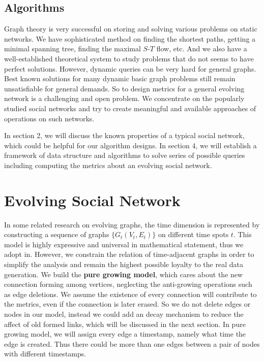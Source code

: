\documentclass[12pt,abstract=true]{scrartcl}
\numberwithin{equation}{section}
\theoremstyle{definition}   \newtheorem{definition}{Definition}[section]
\theoremstyle{plain}        \newtheorem{theorem}{Theorem}[section]
\theoremstyle{plain}        \newtheorem{observation}{Observation}[section]
\theoremstyle{plain}        \newtheorem{fact}{Fact}[section]
\theoremstyle{plain}        \newtheorem{claim}{Claim}[section]
\theoremstyle{plain}        \newtheorem{lemma}[theorem]{Lemma}
\theoremstyle{plain}        \newtheorem{corollary}[theorem]{Corollary}
\theoremstyle{remark}       \newtheorem{example}{Example}[section]
\theoremstyle{remark}       \newtheorem{remark}{Remark}[section]
\begin{document}
\subsection{Algorithms}
Graph theory is very successful on storing and solving various problems on
static networks. We have sophisticated method on finding the shortest
paths, getting a minimal spanning tree, finding the maximal $S$-$T$ flow, etc.
And we also have a well-established theoretical system to study problems that
do not seems to have perfect solutions. However, dynamic queries can be
very hard for general graphs. Best known solutions for many dynamic basic graph
problems still remain unsatisfiable for general demands. So to design metrics
for a general evolving network is a challenging and open problem. We
concentrate on the popularly studied social networks and try to create meaningful
and available approaches of operations on such networks.

In section 2, we will discuss the known properties of a typical social network,
which could be helpful for our algorithm designs. In section 4, we will
establish a framework of data structure and algorithms to solve series of
possible queries including computing the metrics about an evolving social
network.

\section{Evolving Social Network}
In some related research on evolving graphs, the time dimension is represented
by constructing a sequence of graphs $\{G_t(V_t,E_t)\}$ on different time
spots $t$. This model is highly expressive and universal in mathematical
statement, thus we adopt in. However, we constrain the relation of
time-adjacent graphs in order to simplify the analysis and remain the highest
possible loyalty to the real data generation. We build the \textbf{pure growing
model}, which cares about the new connection forming among vertices, neglecting
the anti-growing operations such as edge deletions. We assume the existence of
every connection will contribute to the metrics, even if the connection is
later erased. So we do not delete edges or nodes in our model, instead we could
add an decay mechanism to reduce the affect of old formed links, which will be
discussed in the next section. In pure growing model, we will assign every edge
a timestamp, namely what time the edge is created. Thus there could be more
than one edges between a pair of nodes with different timestamps.
\end{document}
